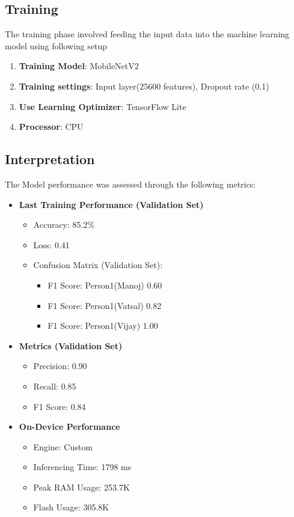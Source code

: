 \subsection{Training}
The training phase involved feeding the input data into the machine learning model using following setup
\begin{enumerate}
	\item \textbf{Training Model}: MobileNetV2 
	\item \textbf{Training settings}: Input layer(25600 features), Dropout rate (0.1)
	\item \textbf{Use Learning Optimizer}: TensorFlow Lite
	\item \textbf{Processor}: CPU
\end{enumerate}

\subsection{Interpretation}
The Model performance was assessed through the following metrics:
\begin{itemize}
	\item \textbf{Last Training Performance (Validation Set)}
	\begin{itemize}
		\item Accuracy: 85.2\%
		\item Loss: 0.41
		\item Confusion Matrix (Validation Set):
		\begin{itemize}
			\item F1 Score: Person1(Manoj) 0.60
			\item F1 Score: Person1(Vatsal) 0.82
			\item F1 Score: Person1(Vijay) 1.00
		\end{itemize}
	\end{itemize}
	
	\item \textbf{Metrics (Validation Set)}
	\begin{itemize}
		\item Precision: 0.90
		\item Recall: 0.85
		\item F1 Score: 0.84
	\end{itemize}
	
	\item \textbf{On-Device Performance}
	\begin{itemize}
		\item Engine: Custom
		\item Inferencing Time: 1798 ms
		\item Peak RAM Usage: 253.7K
		\item Flash Usage: 305.8K
	\end{itemize}
\end{itemize}

